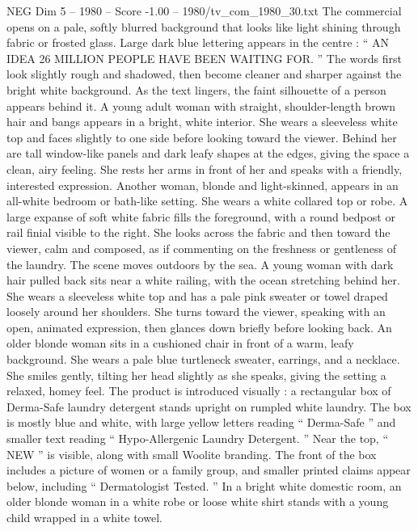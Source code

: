 \begin{textsample}{NEG Dim 5 – 1980 – Score -1.00 – 1980/tv\_com\_1980\_30.txt}  \label{ex:f5_neg_067}
The commercial opens on a pale, softly blurred background that looks like light shining through fabric or frosted glass.
Large dark blue lettering appears in the centre : “ AN IDEA 26 MILLION PEOPLE HAVE BEEN WAITING FOR. ” The words first look slightly rough and shadowed, then become cleaner and sharper against the bright white background.
As the text lingers, the faint silhouette of a person appears behind it.
A young adult woman with straight, shoulder-length brown hair and bangs appears in a bright, white interior.
She wears a sleeveless white top and faces slightly to one side before looking toward the viewer.
Behind her are tall window-like panels and dark leafy shapes at the edges, giving the space a clean, airy feeling.
She rests her arms in front of her and speaks with a friendly, interested expression.
Another woman, blonde and light-skinned, appears in an all-white bedroom or bath-like setting.
She wears a white collared top or robe.
A large expanse of soft white fabric fills the foreground, with a round bedpost or rail finial visible to the right.
She looks across the fabric and then toward the viewer, calm and composed, as if commenting on the freshness or gentleness of the laundry.
The scene moves outdoors by the sea.
A young woman with dark hair pulled back sits near a white railing, with the ocean stretching behind her.
She wears a sleeveless white top and has a pale pink sweater or towel draped loosely around her shoulders.
She turns toward the viewer, speaking with an open, animated expression, then glances down briefly before looking back.
An older blonde woman sits in a cushioned chair in front of a warm, leafy background.
She wears a pale blue turtleneck sweater, earrings, and a necklace.
She smiles gently, tilting her head slightly as she speaks, giving the setting a relaxed, homey feel.
The product is introduced visually : a rectangular box of Derma-Safe laundry detergent stands upright on rumpled white laundry.
The box is mostly blue and white, with large yellow letters reading “ Derma-Safe ” and smaller text reading “ Hypo-Allergenic Laundry Detergent. ” Near the top, “ NEW ” is visible, along with small Woolite branding.
The front of the box includes a picture of women or a family group, and smaller printed claims appear below, including “ Dermatologist Tested. ” In a bright white domestic room, an older blonde woman in a white robe or loose white shirt stands with a young child wrapped in a white towel.

\end{textsample}
